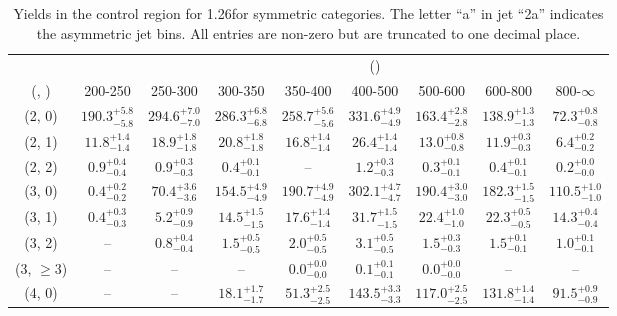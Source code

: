 \begin{table}[h!]
\tiny
\centering
\caption{Yields in the \mj control region for 1.26\ifb for symmetric categories. The letter ``a'' in jet \eg ``2a''  indicates the asymmetric jet bins. All entries are non-zero but are truncated to one decimal place.\label{tab:yieldssep_wjetstolnuht_mu_sym}}
\begin{tabular}
{ccccccccc}
	\hline\hline
&	& \multicolumn{8}{c}{\scalht (\gev)} \\ 
	 (\njet,  \nb) & 200-250 & 250-300 & 300-350 & 350-400 & 400-500 & 500-600 & 600-800 & 800-$\infty$ \\ [0.8ex] 
\hline
	(2, 0) & $190.3^{+ 5.8 }_{- 5.8 }$ & $294.6^{+ 7.0 }_{- 7.0 }$ & $286.3^{+ 6.8 }_{- 6.8 }$ & $258.7^{+ 5.6 }_{- 5.6 }$ & $331.6^{+ 4.9 }_{- 4.9 }$ & $163.4^{+ 2.8 }_{- 2.8 }$ & $138.9^{+ 1.3 }_{- 1.3 }$ & $72.3^{+ 0.8 }_{- 0.8 }$ \\[0.5ex] 
	(2, 1) & $11.8^{+ 1.4 }_{- 1.4 }$ & $18.9^{+ 1.8 }_{- 1.8 }$ & $20.8^{+ 1.8 }_{- 1.8 }$ & $16.8^{+ 1.4 }_{- 1.4 }$ & $26.4^{+ 1.4 }_{- 1.4 }$ & $13.0^{+ 0.8 }_{- 0.8 }$ & $11.9^{+ 0.3 }_{- 0.3 }$ & $6.4^{+ 0.2 }_{- 0.2 }$ \\[0.5ex] 
	(2, 2) & $0.9^{+ 0.4 }_{- 0.4 }$ & $0.9^{+ 0.3 }_{- 0.3 }$ & $0.4^{+ 0.1 }_{- 0.1 }$ & -- & $1.2^{+ 0.3 }_{- 0.3 }$ & $0.3^{+ 0.1 }_{- 0.1 }$ & $0.4^{+ 0.1 }_{- 0.1 }$ & $0.2^{+ 0.0 }_{- 0.0 }$ \\[0.5ex] 
	(3, 0) & $0.4^{+ 0.2 }_{- 0.2 }$ & $70.4^{+ 3.6 }_{- 3.6 }$ & $154.5^{+ 4.9 }_{- 4.9 }$ & $190.7^{+ 4.9 }_{- 4.9 }$ & $302.1^{+ 4.7 }_{- 4.7 }$ & $190.4^{+ 3.0 }_{- 3.0 }$ & $182.3^{+ 1.5 }_{- 1.5 }$ & $110.5^{+ 1.0 }_{- 1.0 }$ \\[0.5ex] 
	(3, 1) & $0.4^{+ 0.3 }_{- 0.3 }$ & $5.2^{+ 0.9 }_{- 0.9 }$ & $14.5^{+ 1.5 }_{- 1.5 }$ & $17.6^{+ 1.4 }_{- 1.4 }$ & $31.7^{+ 1.5 }_{- 1.5 }$ & $22.4^{+ 1.0 }_{- 1.0 }$ & $22.3^{+ 0.5 }_{- 0.5 }$ & $14.3^{+ 0.4 }_{- 0.4 }$ \\[0.5ex] 
	(3, 2) & -- & $0.8^{+ 0.4 }_{- 0.4 }$ & $1.5^{+ 0.5 }_{- 0.5 }$ & $2.0^{+ 0.5 }_{- 0.5 }$ & $3.1^{+ 0.5 }_{- 0.5 }$ & $1.5^{+ 0.3 }_{- 0.3 }$ & $1.5^{+ 0.1 }_{- 0.1 }$ & $1.0^{+ 0.1 }_{- 0.1 }$ \\[0.5ex] 
	(3, $\ge3$) & -- & -- & -- & $0.0^{+ 0.0 }_{- 0.0 }$ & $0.1^{+ 0.1 }_{- 0.1 }$ & $0.0^{+ 0.0 }_{- 0.0 }$ & -- & -- \\[0.5ex] 
	(4, 0) & -- & -- & $18.1^{+ 1.7 }_{- 1.7 }$ & $51.3^{+ 2.5 }_{- 2.5 }$ & $143.5^{+ 3.3 }_{- 3.3 }$ & $117.0^{+ 2.5 }_{- 2.5 }$ & $131.8^{+ 1.4 }_{- 1.4 }$ & $91.5^{+ 0.9 }_{- 0.9 }$ \\[0.5ex] 

\end{tabular}
\end{table}
